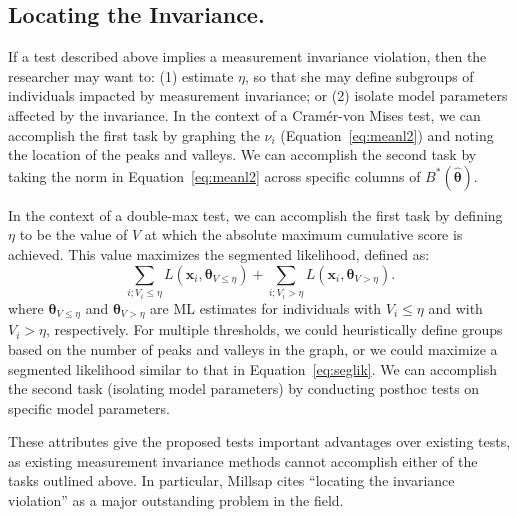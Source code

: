 \documentclass[man]{apa}
\begin{document}
\subsection{Locating the Invariance.}
If a test described above implies a measurement invariance violation,
then the researcher may want to: (1) estimate $\eta$, so that she may
define subgroups of individuals impacted by measurement invariance;
or (2) isolate model
parameters affected by the invariance.  
In the context of a Cram\'{e}r-von Mises test, we can accomplish the
first task by graphing the $\nu_i$ (Equation~\eqref{eq:meanl2})
and noting the location of the peaks and valleys.  We can accomplish
the second task by taking the norm in Equation~\eqref{eq:meanl2}
across specific columns of $B^{\ast}(\widehat{\bm \theta})$.

In the context of a double-max test, we can accomplish the first task
by defining $\eta$ to be the value
of $V$ at which the absolute
maximum cumulative score is achieved.  This value maximizes the
segmented likelihood, defined as:
\begin{equation}
    \label{eq:seglik}
    \sum_{i; V_i \leq \eta} L(\bm{x}_i, \bm{\theta}_{V \leq \eta}) + 
     \sum_{i; V_i > \eta} L(\bm{x}_i, \bm{\theta}_{V > \eta}).
\end{equation}
where $\bm{\theta}_{V \leq \eta}$ and $\bm{\theta}_{V > \eta}$ are ML estimates
for individuals with 
$V_i \leq \eta$ and with $V_i > \eta$, respectively.
  For multiple thresholds, we
could heuristically define groups based on the number of peaks and
valleys in the graph, or we could maximize a segmented likelihood
similar to that in Equation~\eqref{eq:seglik}.
We can accomplish the second task (isolating model parameters) by
conducting posthoc 
tests on specific model parameters.  

These attributes give the proposed tests important advantages over
existing tests, as existing measurement invariance methods cannot
accomplish either of the tasks outlined above.
In particular, Millsap \citeyear{Mil05} cites
``locating the invariance violation'' as a major outstanding problem
in the field.
\end{document}

